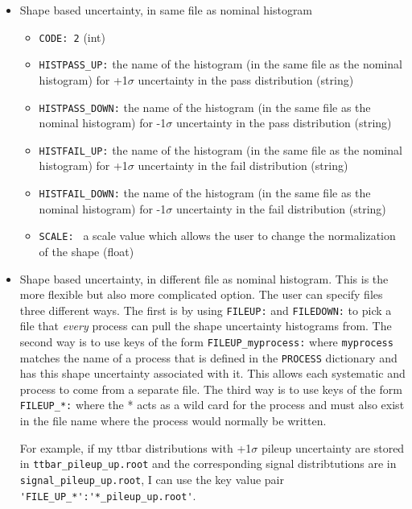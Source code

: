 \documentclass[letter]{article}
\begin{document}
            \begin{itemize}
                \item Shape based uncertainty, in same file as nominal histogram
                \begin{itemize}
                    \item \verb"CODE: 2" (int)
                    \item \verb"HISTPASS_UP:" the name of the histogram (in the same file as the nominal histogram) for +1$\sigma$ uncertainty in the pass distribution (string)
                    \item \verb"HISTPASS_DOWN:" the name of the histogram (in the same file as the nominal histogram) for -1$\sigma$ uncertainty in the pass distribution (string)
                    \item \verb"HISTFAIL_UP:" the name of the histogram (in the same file as the nominal histogram) for +1$\sigma$ uncertainty in the fail distribution (string)
                    \item \verb"HISTFAIL_DOWN:" the name of the histogram (in the same file as the nominal histogram) for -1$\sigma$ uncertainty in the fail distribution (string)
                    \item \verb"SCALE: " a scale value which allows the user to change the normalization of the shape (float)

                \end{itemize}
                \item Shape based uncertainty, in different file as nominal histogram. This is the more flexible but also more complicated option. 
                The user can specify files three different ways. The first is by using \verb"FILEUP:" and \verb"FILEDOWN:" to pick a file that \textit{every} process can pull the shape uncertainty histograms from. The second way is to use keys of the form \verb"FILEUP_myprocess:" where \verb"myprocess" matches the name of a process that is defined in the \verb"PROCESS" dictionary and has this shape uncertainty associated with it. This allows each systematic and process to come from a separate file. The third way is to use keys of the form \verb"FILEUP_*:" where the * acts as a wild card for the process and must also exist in the file name where the process would normally be written.

                For example, if my ttbar distributions with +1$\sigma$ pileup uncertainty are stored in \verb"ttbar_pileup_up.root" and the corresponding signal distribtutions are in \verb"signal_pileup_up.root", I can use the key value pair \verb"'FILE_UP_*':'*_pileup_up.root'".


\end{itemize}
\end{document}
